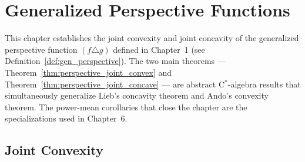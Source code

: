 \chapter{Generalized Perspective Functions}

This chapter establishes the joint convexity and joint concavity of the generalized
perspective function $(f \triangle g)$ defined in Chapter~1
(see Definition~\ref{def:gen_perspective}).
The two main theorems --- Theorem~\ref{thm:perspective_joint_convex} and
Theorem~\ref{thm:perspective_joint_concave} --- are abstract C$^*$-algebra results
that simultaneously generalize Lieb's concavity theorem and Ando's convexity theorem.
The power-mean corollaries that close the chapter are the specializations used in
Chapter~6.

\section{Joint Convexity}

